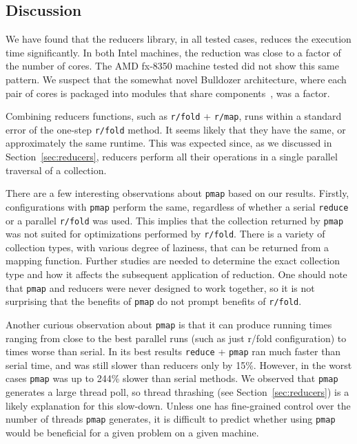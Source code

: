 \documentclass[12pt]{article}
\newcommand{\clocode}[1]{{\texttt {#1}}}
\begin{document}
\subsection{Discussion}\label{sec:discussion}

We have found that the reducers library, in all tested cases, reduces the execution time significantly. In both Intel machines, the reduction was close to a factor of the number of cores. The AMD fx-8350 machine tested did not show this same pattern. We suspect that the somewhat novel Bulldozer architecture, where each pair of cores is packaged into modules that share components~\cite{McIntyre:2012},  was a factor. 

Combining reducers functions, such as \clocode{r/fold} + \clocode{r/map}, runs within a standard error of the one-step \clocode{r/fold} method. It seems likely that they have the same, or approximately the same runtime. This was expected since, as we discussed in Section~\ref{sec:reducers}, reducers perform all their operations in a single parallel traversal of a collection. 

There are a few interesting observations about \clocode{pmap} based on our results. Firstly, configurations with \clocode{pmap} perform the same, regardless of whether a serial \clocode{reduce} or a parallel \clocode{r/fold} was used. This implies that the collection returned by \clocode{pmap} was not suited for optimizations performed by \clocode{r/fold}. 
There is a variety of collection types, with various degree of laziness, that can be returned from a mapping function. 
Further studies are needed to determine the exact collection type and how it affects the subsequent application of reduction. 
One should note that \clocode{pmap} and reducers were never designed to work together, so it is not surprising that the benefits of  \clocode{pmap} do not prompt benefits of \clocode{r/fold}. 

Another curious observation about  \clocode{pmap} is that it can produce running times ranging from close to the best parallel runs (such as just r/fold configuration) to times worse than serial. In its best results \clocode{reduce} + \clocode{pmap} ran much faster than serial time, and was still slower than reducers only by 15\%. However, in the worst cases  \clocode{pmap} was up to 244\% slower than serial methods. We observed that  \clocode{pmap} generates a large thread poll, so thread thrashing (see Section~\ref{sec:reducers}) is a likely explanation for this slow-down. Unless one has fine-grained control over the number of threads \clocode{pmap} generates, it is difficult to predict whether using  \clocode{pmap} would be beneficial for a given problem on a given machine. 
\end{document}
